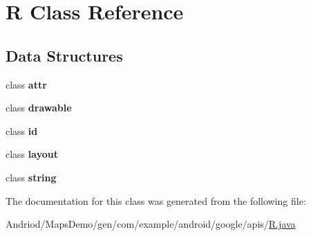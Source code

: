 \hypertarget{classcom_1_1example_1_1android_1_1google_1_1apis_1_1_r}{\section{R Class Reference}
\label{classcom_1_1example_1_1android_1_1google_1_1apis_1_1_r}
}
\subsection*{Data Structures}
\begin{DoxyCompactItemize}
\item 
class {\bfseries attr}
\item 
class {\bfseries drawable}
\item 
class {\bfseries id}
\item 
class {\bfseries layout}
\item 
class {\bfseries string}
\end{DoxyCompactItemize}


The documentation for this class was generated from the following file\-:\begin{DoxyCompactItemize}
\item 
Andriod/\-Maps\-Demo/gen/com/example/android/google/apis/\hyperlink{_maps_demo_2gen_2com_2example_2android_2google_2apis_2_r_8java}{R.\-java}\end{DoxyCompactItemize}
